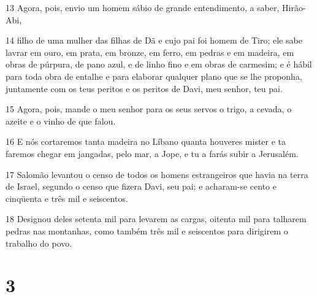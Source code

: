 \par 13 Agora, pois, envio um homem sábio de grande entendimento, a saber, Hirão-Abi,
\par 14 filho de uma mulher das filhas de Dã e cujo pai foi homem de Tiro; ele sabe lavrar em ouro, em prata, em bronze, em ferro, em pedras e em madeira, em obras de púrpura, de pano azul, e de linho fino e em obras de carmesim; e é hábil para toda obra de entalhe e para elaborar qualquer plano que se lhe proponha, juntamente com os teus peritos e os peritos de Davi, meu senhor, teu pai.
\par 15 Agora, pois, mande o meu senhor para os seus servos o trigo, a cevada, o azeite e o vinho de que falou.
\par 16 E nós cortaremos tanta madeira no Líbano quanta houveres mister e ta faremos chegar em jangadas, pelo mar, a Jope, e tu a farás subir a Jerusalém.
\par 17 Salomão levantou o censo de todos os homens estrangeiros que havia na terra de Israel, segundo o censo que fizera Davi, seu pai; e acharam-se cento e cinqüenta e três mil e seiscentos.
\par 18 Designou deles setenta mil para levarem as cargas, oitenta mil para talharem pedras nas montanhas, como também três mil e seiscentos para dirigirem o trabalho do povo.

\chapter{3}

